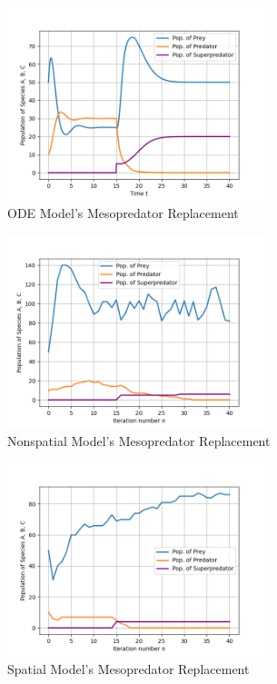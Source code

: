 \documentclass[journal]{IEEEtran}
\begin{document}
\begin{figure}[h]
    \vspace{-5mm}
    \centering
    \includegraphics[width=7.5cm]{images/mesopredator_replacement_ode.png}
    \vspace{-8mm}
    \caption{ODE Model's Mesopredator Replacement}
    \label{fig:mesopredator_replacement_ode}
\end{figure}
\begin{figure}[h]
    \vspace{-7mm}
    \centering
    \includegraphics[width=7.5cm]{images/mesopredator_replacement_nonspatial.png}
    \vspace{-8mm}
    \caption{Nonspatial Model's Mesopredator Replacement}
    \label{fig:mesopredator_replacement_nonspatial}
\end{figure}
\begin{figure}[h]
    \vspace{-7mm}
    \centering
    \includegraphics[width=7.5cm]{images/mesopredator_replacement_spatial.png}
    \vspace{-8mm}
    \caption{Spatial Model's Mesopredator Replacement}
    \label{fig:mesopredator_replacement_spatial}
\end{figure}
\end{document}
